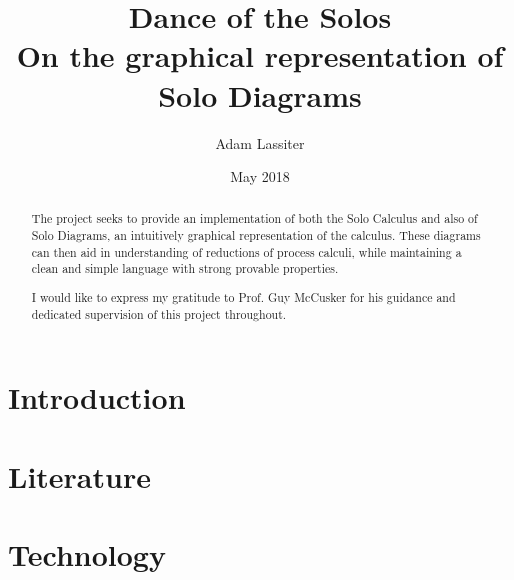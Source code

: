 \documentclass{article}
\title{Dance of the Solos \\
    \large On the graphical representation of Solo Diagrams}
\author{Adam Lassiter}
\date{May 2018}
\begin{document}
    
    \maketitle
    \vspace{\fill}
    \begin{abstract}
        The project seeks to provide an implementation of both the Solo Calculus and also of Solo Diagrams, an intuitively graphical representation of the calculus.
        These diagrams can then aid in understanding of reductions of process calculi, while maintaining a clean and simple language with strong provable properties.
    \end{abstract}
    \vspace{\fill}
    \begin{figure}[H]
        \centering
        \def\svgwidth{\columnwidth/3}
        
    \end{figure}
    \vspace{\fill}
    \pagebreak
    
    \renewcommand{\abstractname}{Acknowledgements}
    \null\vspace{\fill}
    \begin{abstract}
        I would like to express my gratitude to Prof. Guy McCusker for his guidance and dedicated supervision of this project throughout.
    \end{abstract}
    \vspace{\fill}
    \pagebreak
    
    \tableofcontents
    \pagebreak

    \section{Introduction}

    \section{Literature}
        
        
        
        

    \section{Technology}
\end{document}
